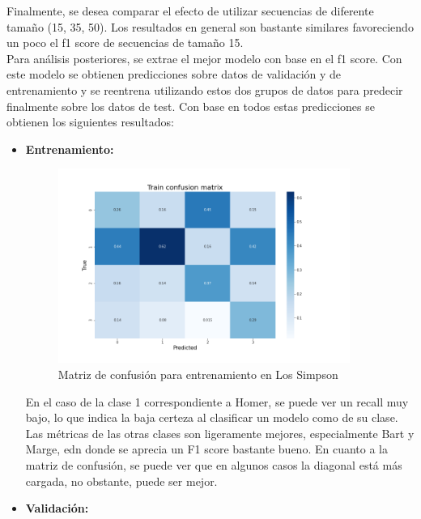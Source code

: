 Finalmente, se desea comparar el efecto de utilizar secuencias de diferente tamaño (15, 35, 50). Los resultados en general son bastante similares favoreciendo un poco el f1 score de secuencias de tamaño 15.\\

Para análisis posteriores, se extrae el mejor modelo con base en el f1 score. Con este modelo se obtienen predicciones sobre datos de validación y de entrenamiento y se reentrena utilizando estos dos grupos de datos para predecir finalmente sobre los datos de test. Con base en todos estas predicciones se obtienen los siguientes resultados:

\begin{itemize}
    \item \textbf{Entrenamiento:}
    
    
    \begin{figure}
        \centering
        \includegraphics[width=0.9\textwidth]{results/simpson/deepModels/Train.png}
        \caption{Matriz de confusión para entrenamiento en Los Simpson}
        \label{fig:my_label}
    \end{figure}
    
    En el caso de la clase 1 correspondiente a Homer, se puede ver un recall muy bajo, lo que indica la baja certeza al clasificar un modelo como de su clase. Las métricas de las otras clases son ligeramente mejores, especialmente Bart y Marge, edn donde se aprecia un F1 score bastante bueno. En cuanto a la matriz de confusión, se puede ver que en algunos casos la diagonal está más cargada, no obstante, puede ser mejor.
    
    \item \textbf{Validación:}
    
    

\end{itemize}
